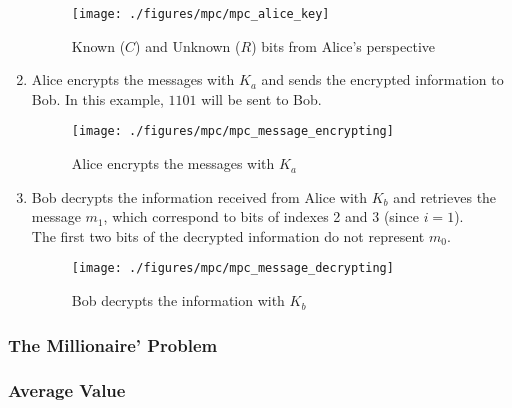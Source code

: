\begin{refsection}
\begin{enumerate}
\begin{figure}[H]
\centering
\texttt{[image: ./figures/mpc/mpc\_alice\_key]}
\caption{Known ($C$) and Unknown ($R$) bits from Alice's perspective }
\label{fig:knownalice}
\end{figure}
\item Alice encrypts the messages with $K_a$ and sends the encrypted information to Bob. In this example, $1101$ will be sent to Bob.
\renewcommand{\figurename}{Figure}
\begin{figure}[H]
\centering
\texttt{[image: ./figures/mpc/mpc\_message\_encrypting]}
\caption{Alice encrypts the messages with $K_a$}
\label{fig:mpcencryption}
\end{figure}
\item Bob decrypts the information received from Alice with $K_b$ and retrieves the message $m_1$, which correspond to bits of indexes 2 and 3 (since $i=1$).\\
The first two bits of the decrypted information do not represent $m_0$.
\renewcommand{\figurename}{Figure}
\begin{figure}[H]
\centering
\texttt{[image: ./figures/mpc/mpc\_message\_decrypting]}
\caption{Bob decrypts the information with $K_b$}
\label{fig:mpcdecryption}
\end{figure}
\end{enumerate}

\subsubsection{The Millionaire' Problem}
\subsubsection{Average Value}



\clearpage
\printbibliography[heading=subbibliography]
\end{refsection}
\cleardoublepage
